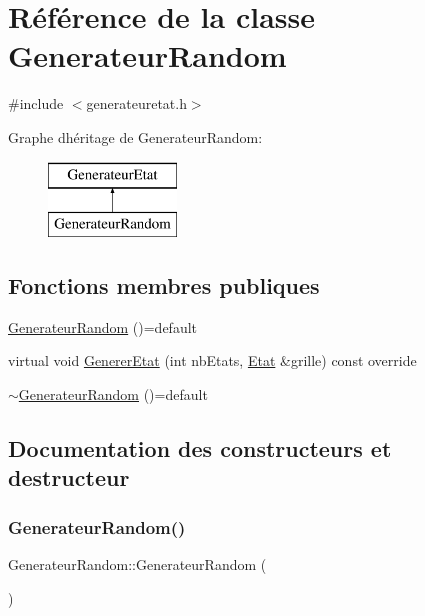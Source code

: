 \hypertarget{class_generateur_random}{}\section{Référence de la classe Generateur\+Random}
\label{class_generateur_random}


{\ttfamily \#include $<$generateuretat.\+h$>$}

Graphe d\textquotesingle{}héritage de Generateur\+Random\+:\begin{figure}[H]
\begin{center}
\leavevmode
\includegraphics[height=2.000000cm]{class_generateur_random}
\end{center}
\end{figure}
\subsection*{Fonctions membres publiques}
\begin{DoxyCompactItemize}
\item 
\mbox{\hyperlink{class_generateur_random_a5c9892ae082709ff222116e7b8376885}{Generateur\+Random}} ()=default
\item 
virtual void \mbox{\hyperlink{class_generateur_random_ab110072502487c78f0b7dc0c7f2241c7}{Generer\+Etat}} (int nb\+Etats, \mbox{\hyperlink{class_etat}{Etat}} \&grille) const override
\item 
\mbox{\hyperlink{class_generateur_random_a6e8465717258a90158700cd4120ce10b}{$\sim$\+Generateur\+Random}} ()=default
\end{DoxyCompactItemize}


\subsection{Documentation des constructeurs et destructeur}
\mbox{\label{class_generateur_random_a5c9892ae082709ff222116e7b8376885}} 
\subsubsection{\texorpdfstring{Generateur\+Random()}{GenerateurRandom()}}
{\footnotesize\ttfamily Generateur\+Random\+::\+Generateur\+Random (\begin{DoxyParamCaption}{ }\end{DoxyParamCaption})\hspace{0.3cm}{\ttfamily [default]}}

